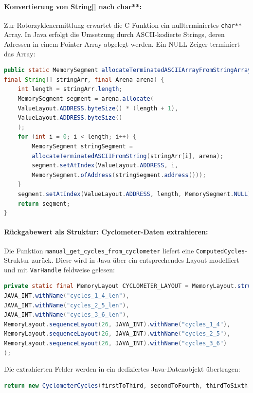 \documentclass[12pt, ngerman, a4paper, numbers=noenddot]{article}
\begin{document}
\paragraph{Konvertierung von String[] nach char**:}
Zur Rotorzyklenermittlung erwartet die C-Funktion ein nullterminiertes \lstinline|char**|-Array. In Java erfolgt die Umsetzung durch ASCII-kodierte Strings, deren Adressen in einem Pointer-Array abgelegt werden. Ein NULL-Zeiger terminiert das Array:
\begin{lstlisting}[language=Java, caption=Konvertierung von String zu char**]
public static MemorySegment allocateTerminatedASCIIArrayFromStringArray(
final String[] stringArr, final Arena arena) {
	int length = stringArr.length;
	MemorySegment segment = arena.allocate(
	ValueLayout.ADDRESS.byteSize() * (length + 1),
	ValueLayout.ADDRESS.byteSize()
	);
	for (int i = 0; i < length; i++) {
		MemorySegment stringSegment = 
		allocateTerminatedASCIIFromString(stringArr[i], arena);
		segment.setAtIndex(ValueLayout.ADDRESS, i, 
		MemorySegment.ofAddress(stringSegment.address()));
	}
	segment.setAtIndex(ValueLayout.ADDRESS, length, MemorySegment.NULL);
	return segment;
}
\end{lstlisting}

\paragraph{Rückgabewert als Struktur: Cyclometer-Daten extrahieren:}
Die Funk\-tion \lstinline|manual_get_cycles_from_cyclometer| liefert eine \lstinline|ComputedCycles|-Struktur zurück. Diese wird in Java über ein entsprechendes Layout modelliert und mit \lstinline|VarHandle| feldweise gelesen:

\begin{lstlisting}[language=Java, caption=Layout des Rückgabewerts ComputedCycles]
private static final MemoryLayout CYCLOMETER_LAYOUT = MemoryLayout.structLayout(
JAVA_INT.withName("cycles_1_4_len"),
JAVA_INT.withName("cycles_2_5_len"),
JAVA_INT.withName("cycles_3_6_len"),
MemoryLayout.sequenceLayout(26, JAVA_INT).withName("cycles_1_4"),
MemoryLayout.sequenceLayout(26, JAVA_INT).withName("cycles_2_5"),
MemoryLayout.sequenceLayout(26, JAVA_INT).withName("cycles_3_6")
);
\end{lstlisting}

Die extrahierten Felder werden in ein dediziertes Java-Datenobjekt übertragen:

\begin{lstlisting}[language=Java]
return new CyclometerCycles(firstToThird, secondToFourth, thirdToSixth);
\end{lstlisting}
\end{document}
